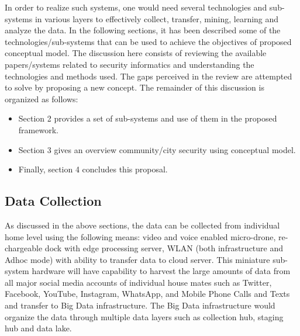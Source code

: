 \documentclass[sigconf]{acmart}
\begin{document}
In order to realize such systems, one would need several technologies and sub-systems in various layers to effectively collect, transfer, mining, learning and analyze the data. In the following sections, it has been described some of the technologies/sub-systems that can be used to achieve the objectives of proposed conceptual model.
The discussion here consists of reviewing the available papers/systems related to security informatics and understanding the technologies and methods used. The gaps perceived in the review are attempted to solve by proposing a new concept. The remainder of this discussion is organized as follows:
\begin{itemize}
  \item Section 2 provides a set of sub-systems and use of them in the proposed framework. 
  \item Section 3 gives an overview community/city security using conceptual model. \item Finally, section 4 concludes this proposal.
\end{itemize}

\subsection{Data Collection}
As discussed in the above sections, the data can be collected from individual home level using the following means: video and voice enabled micro-drone, re-chargeable dock with edge processing server, WLAN (both infrastructure and Adhoc mode) with ability to transfer data to cloud server. This miniature sub-system hardware will have capability to harvest the large amounts of data from all major social media accounts of individual house mates such as Twitter, Facebook, YouTube, Instagram, WhatsApp, and Mobile Phone Calls and Texts and transfer to Big Data infrastructure. The Big Data infrastructure would organize the data through multiple data layers such as collection hub, staging hub and data lake.
\end{document}

